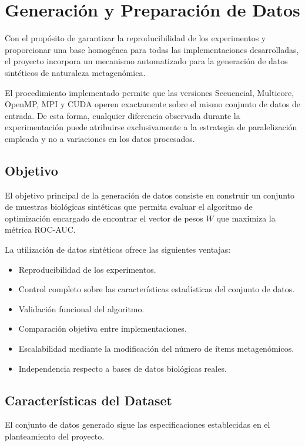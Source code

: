 \chapter{Generación y Preparación de Datos}

Con el propósito de garantizar la reproducibilidad de los experimentos y proporcionar una base homogénea para todas las implementaciones desarrolladas, el proyecto incorpora un mecanismo automatizado para la generación de datos sintéticos de naturaleza metagenómica.

El procedimiento implementado permite que las versiones Secuencial, Multicore, OpenMP, MPI y CUDA operen exactamente sobre el mismo conjunto de datos de entrada. De esta forma, cualquier diferencia observada durante la experimentación puede atribuirse exclusivamente a la estrategia de paralelización empleada y no a variaciones en los datos procesados.

\section{Objetivo}

El objetivo principal de la generación de datos consiste en construir un conjunto de muestras biológicas sintéticas que permita evaluar el algoritmo de optimización encargado de encontrar el vector de pesos $W$ que maximiza la métrica ROC-AUC.

La utilización de datos sintéticos ofrece las siguientes ventajas:

\begin{itemize}
\item Reproducibilidad de los experimentos.
\item Control completo sobre las características estadísticas del conjunto de datos.
\item Validación funcional del algoritmo.
\item Comparación objetiva entre implementaciones.
\item Escalabilidad mediante la modificación del número de ítems metagenómicos.
\item Independencia respecto a bases de datos biológicas reales.
\end{itemize}

\section{Características del Dataset}

El conjunto de datos generado sigue las especificaciones establecidas en el planteamiento del proyecto.

